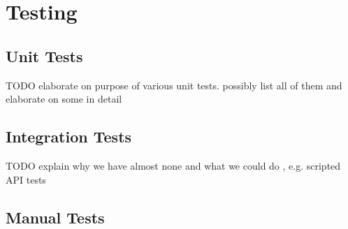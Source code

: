 \section{Testing}

\subsection{Unit Tests}

TODO elaborate on purpose of various unit tests.
possibly list all of them and elaborate on some in detail

\subsection{Integration Tests}

TODO explain why we have almost none and what we could do
, e.g. scripted API tests

\subsection{Manual Tests}


